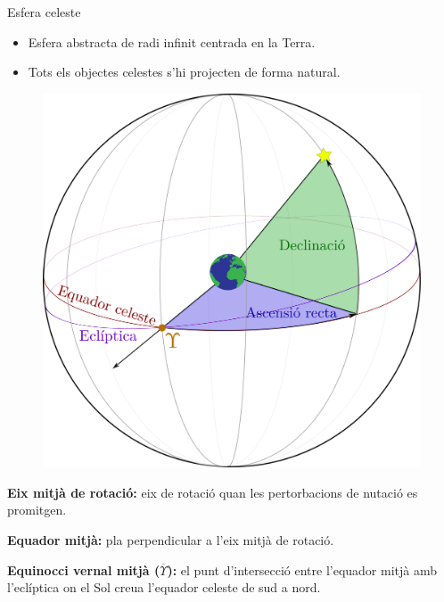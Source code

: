 \documentclass{beamer} %
\begin{document}
\begin{frame}{Esfera celeste}
  \begin{itemize}
    \item Esfera abstracta de radi infinit centrada en la Terra.
    \item Tots els objectes celestes s'hi projecten de forma natural.
  \end{itemize}
  \begin{minipage}{0.45\textwidth}
    \begin{figure}
      \centering
      \includegraphics[width=\textwidth]{../Images/right_ascension-decli_ca.pdf}
    \end{figure}
  \end{minipage}\hfill
  \begin{minipage}{0.5\textwidth}
    \textbf{Eix mitjà de rotació:} eix de rotació quan les pertorbacions de nutació es promitgen.

    \textbf{Equador mitjà:} pla perpendicular a l'eix mitjà de rotació.

    \textbf{Equinocci vernal mitjà ($\overline{\Upsilon}$):} el punt d'intersecció entre l'equador mitjà amb l'eclíptica on el Sol creua l'equador celeste de sud a nord.

  \end{minipage}
\end{frame}
\end{document}
